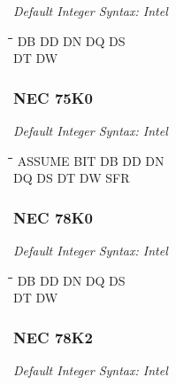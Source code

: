 {\em Default Integer Syntax: Intel}

{\tt\begin{tabbing}
\hspace{3cm}\=\hspace{3cm}\=\hspace{3cm}\=\hspace{3cm}\=\kill
DB         \> DD          \> DN          \> DQ          \>DS \\
DT         \> DW \\
\end{tabbing}}

\subsubsection{NEC 75K0}

{\em Default Integer Syntax: Intel}

{\tt\begin{tabbing}
\hspace{3cm}\=\hspace{3cm}\=\hspace{3cm}\=\hspace{3cm}\=\kill
ASSUME     \> BIT         \> DB          \> DD          \> DN \\
DQ         \> DS          \> DT          \> DW          \> SFR \\
\end{tabbing}}

\subsubsection{NEC 78K0}

{\em Default Integer Syntax: Intel}

{\tt\begin{tabbing}
\hspace{3cm}\=\hspace{3cm}\=\hspace{3cm}\=\hspace{3cm}\=\kill
DB         \> DD          \> DN          \> DQ          \> DS \\
DT         \> DW \\
\end{tabbing}}

\subsubsection{NEC 78K2}

{\em Default Integer Syntax: Intel}

